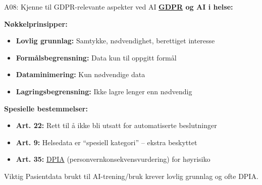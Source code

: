 \documentclass[aspectratio=169, 10pt]{beamer}
\begin{document}
\begin{frame}{A08: Kjenne til GDPR-relevante aspekter ved AI}
    \textbf{\href{https://gdpr.eu/}{GDPR} og AI i helse:}
    
    \vspace{0.3cm}
    \textbf{Nøkkelprinsipper:}
    \begin{itemize}
        \item \textbf{Lovlig grunnlag:} Samtykke, nødvendighet, berettiget interesse
        \item \textbf{Formålsbegrensning:} Data kun til oppgitt formål
        \item \textbf{Dataminimering:} Kun nødvendige data
        \item \textbf{Lagringsbegrensning:} Ikke lagre lenger enn nødvendig
    \end{itemize}
    
    \vspace{0.3cm}
    \textbf{Spesielle bestemmelser:}
    \begin{itemize}
        \item \textbf{Art. 22:} Rett til å ikke bli utsatt for automatiserte beslutninger
        \item \textbf{Art. 9:} Helsedata er ``spesiell kategori'' -- ekstra beskyttet
        \item \textbf{Art. 35:} \href{https://gdpr.eu/data-protection-impact-assessment-template/}{DPIA} (personvernkonsekvensvurdering) for høyrisiko
    \end{itemize}
    
    \vspace{0.3cm}
    \begin{alertblock}{Viktig}
        Pasientdata brukt til AI-trening/bruk krever lovlig grunnlag og ofte DPIA.
    \end{alertblock}
\end{frame}
\end{document}
